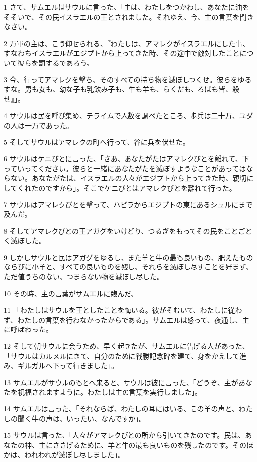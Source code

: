 \par 1 さて、サムエルはサウルに言った、「主は、わたしをつかわし、あなたに油をそそいで、その民イスラエルの王とされました。それゆえ、今、主の言葉を聞きなさい。
\par 2 万軍の主は、こう仰せられる、『わたしは、アマレクがイスラエルにした事、すなわちイスラエルがエジプトから上ってきた時、その途中で敵対したことについて彼らを罰するであろう。
\par 3 今、行ってアマレクを撃ち、そのすべての持ち物を滅ぼしつくせ。彼らをゆるすな。男も女も、幼な子も乳飲み子も、牛も羊も、らくだも、ろばも皆、殺せ』」。
\par 4 サウルは民を呼び集め、テライムで人数を調べたところ、歩兵は二十万、ユダの人は一万であった。
\par 5 そしてサウルはアマレクの町へ行って、谷に兵を伏せた。
\par 6 サウルはケニびとに言った、「さあ、あなたがたはアマレクびとを離れて、下っていってください。彼らと一緒にあなたがたを滅ぼすようなことがあってはならない。あなたがたは、イスラエルの人々がエジプトから上ってきた時、親切にしてくれたのですから」。そこでケニびとはアマレクびとを離れて行った。
\par 7 サウルはアマレクびとを撃って、ハビラからエジプトの東にあるシュルにまで及んだ。
\par 8 そしてアマレクびとの王アガグをいけどり、つるぎをもってその民をことごとく滅ぼした。
\par 9 しかしサウルと民はアガグをゆるし、また羊と牛の最も良いもの、肥えたものならびに小羊と、すべての良いものを残し、それらを滅ぼし尽すことを好まず、ただ値うちのない、つまらない物を滅ぼし尽した。
\par 10 その時、主の言葉がサムエルに臨んだ、
\par 11 「わたしはサウルを王としたことを悔いる。彼がそむいて、わたしに従わず、わたしの言葉を行わなかったからである」。サムエルは怒って、夜通し、主に呼ばわった。
\par 12 そして朝サウルに会うため、早く起きたが、サムエルに告げる人があった、「サウルはカルメルにきて、自分のために戦勝記念碑を建て、身をかえして進み、ギルガルへ下って行きました」。
\par 13 サムエルがサウルのもとへ来ると、サウルは彼に言った、「どうぞ、主があなたを祝福されますように。わたしは主の言葉を実行しました」。
\par 14 サムエルは言った、「それならば、わたしの耳にはいる、この羊の声と、わたしの聞く牛の声は、いったい、なんですか」。
\par 15 サウルは言った、「人々がアマレクびとの所から引いてきたのです。民は、あなたの神、主にささげるために、羊と牛の最も良いものを残したのです。そのほかは、われわれが滅ぼし尽しました」。
